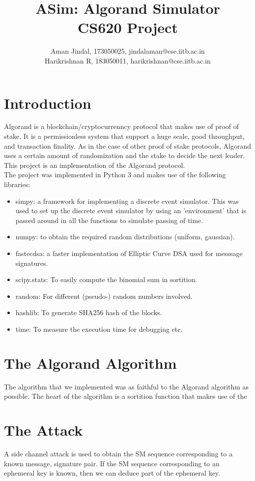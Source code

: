 \documentclass[11pt]{article}
\title{\textbf{ASim: Algorand Simulator}\\ {\normalsize CS620 Project}}
\author{Aman Jindal, 173050025, jindalaman@cse.iitb.ac.in\\
		Harikrishnan R, 183050011, harikrishnan@cse.iitb.ac.in}
\date{}
\begin{document}
\maketitle
\graphicspath{{images/}}
\section{Introduction}
Algorand is a blockchain/cryptocurrenncy protocol that makes use of proof of stake. It is a permissionless system that support a huge scale, good throughput, and transaction finality. As in the case of other proof of stake protocols, Algorand uses a certain amount of randomization and the stake to decide the next leader. This project is an implementation of the Algorand protocol.\\ 

The project was implemented in Python 3 and makes use of the following libraries:
\begin{itemize}
	\item simpy: a framework for implementing a discrete event simulator. This was used to set up the discrete event simulator by using an 'environment' that is passed around in all the functions to simulate passing of time.
	\item numpy: to obtain the required random distributions (uniform, gaussian).
	\item fastecdsa: a faster implementation of Elliptic Curve DSA used for messsage signatures.
	\item scipy.stats: To easily compute the binomial sum in sortition.
	\item random: For different (pseudo-) random numbers involved.
	\item hashlib: To generate SHA256 hash of the blocks.
	\item time: To measure the execution time for debugging etc.
\end {itemize}


\section{The Algorand Algorithm}
The algorithm that we implemented was as faithful to the Algorand algorithm as possible. The heart of the algorithm is a sortition function that makes use of the 
\section{The Attack}
A side channel attack is used to obtain the SM sequence corresponding to a known message, signature pair. If the SM sequence corresponding to an ephemeral key is known, then we can deduce part of the ephemeral key.\\
\end{document}
